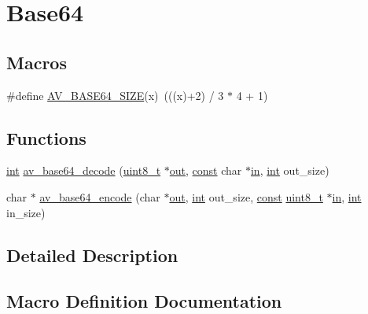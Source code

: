 \hypertarget{group__lavu__base64}{}\section{Base64}
\label{group__lavu__base64}
\subsection*{Macros}
\begin{DoxyCompactItemize}
\item 
\#define \hyperlink{group__lavu__base64_gaa79f39ca3f737b662ae6711d2cbecd20}{A\+V\+\_\+\+B\+A\+S\+E64\+\_\+\+S\+I\+ZE}(x)~(((x)+2) / 3 $\ast$ 4 + 1)
\end{DoxyCompactItemize}
\subsection*{Functions}
\begin{DoxyCompactItemize}
\item 
\hyperlink{xmltok_8h_a5a0d4a5641ce434f1d23533f2b2e6653}{int} \hyperlink{group__lavu__base64_gac8837266968329642080627f3aec9ab8}{av\+\_\+base64\+\_\+decode} (\hyperlink{lib-src_2ffmpeg_2win32_2stdint_8h_a9a941819355e6f658991890ff66b4b0e}{uint8\+\_\+t} $\ast$\hyperlink{latency_8c_a71fd1c281affec034757279e4f91c50b}{out}, \hyperlink{getopt1_8c_a2c212835823e3c54a8ab6d95c652660e}{const} char $\ast$\hyperlink{latency_8c_a7d946209d777cb95fe30364b8d321207}{in}, \hyperlink{xmltok_8h_a5a0d4a5641ce434f1d23533f2b2e6653}{int} out\+\_\+size)
\item 
char $\ast$ \hyperlink{group__lavu__base64_ga67f87e333f9ff84ec19374e0ad46de13}{av\+\_\+base64\+\_\+encode} (char $\ast$\hyperlink{latency_8c_a71fd1c281affec034757279e4f91c50b}{out}, \hyperlink{xmltok_8h_a5a0d4a5641ce434f1d23533f2b2e6653}{int} out\+\_\+size, \hyperlink{getopt1_8c_a2c212835823e3c54a8ab6d95c652660e}{const} \hyperlink{lib-src_2ffmpeg_2win32_2stdint_8h_a9a941819355e6f658991890ff66b4b0e}{uint8\+\_\+t} $\ast$\hyperlink{latency_8c_a7d946209d777cb95fe30364b8d321207}{in}, \hyperlink{xmltok_8h_a5a0d4a5641ce434f1d23533f2b2e6653}{int} in\+\_\+size)
\end{DoxyCompactItemize}


\subsection{Detailed Description}


\subsection{Macro Definition Documentation}
